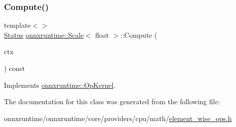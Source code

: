 \subsubsection{\texorpdfstring{Compute()}{Compute()}\hspace{0.1cm}{\footnotesize\ttfamily [2/2]}}
{\footnotesize\ttfamily template$<$$>$ \\
\mbox{\hyperlink{classonnxruntime_1_1common_1_1Status}{Status}} \mbox{\hyperlink{classonnxruntime_1_1Scale}{onnxruntime\+::\+Scale}}$<$ float $>$\+::Compute (\begin{DoxyParamCaption}\item[{\mbox{\hyperlink{classonnxruntime_1_1OpKernelContext}{Op\+Kernel\+Context}} $\ast$}]{ctx }\end{DoxyParamCaption}) const\hspace{0.3cm}{\ttfamily [virtual]}}



Implements \mbox{\hyperlink{classonnxruntime_1_1OpKernel_a9eca8656a78b1b3ab9d3351a12798650}{onnxruntime\+::\+Op\+Kernel}}.



The documentation for this class was generated from the following file\+:\begin{DoxyCompactItemize}
\item 
onnxruntime/onnxruntime/core/providers/cpu/math/\mbox{\hyperlink{element__wise__ops_8h}{element\+\_\+wise\+\_\+ops.\+h}}\end{DoxyCompactItemize}
